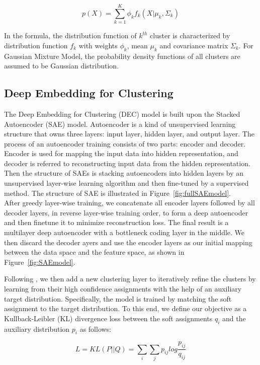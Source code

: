 \documentclass[12pt]{article}
\begin{document}
\begin{equation}
    p(X)=\sum_{k=1}^K\phi_k f_k(X|\mu_k,\Sigma_k)
\end{equation}

In the formula, the distribution function of $k^{th}$ cluster is characterized by distribution function $f_k$ 
with weights $\phi_k$, mean $\mu_k$ and covariance matrix $\Sigma_k$. For Gaussian Mixture Model, the 
probability density functions of all clusters are assumed to be Gaussian distribution.

\subsection{Deep Embedding for Clustering}

The Deep Embedding for Clustering (DEC) model is built upon the Stacked Autoencoder (SAE) model. 
Autoencoder is a kind of unsupervised learning structure that owns three layers: input layer, hidden layer, 
and output layer. The process of an autoencoder training consists of two parts: encoder and decoder. 
Encoder is used for mapping the input data into hidden representation, and decoder is referred to reconstructing 
input data from the hidden representation. Then the structure of SAEs is stacking autoencoders into hidden 
layers by an unsupervised layer-wise learning algorithm and then fine-tuned by a supervised method. The structure
of SAE is illustrated in Figure~\ref{fig:fullSAEmodel}.\\
After greedy layer-wise training, we concatenate all encoder layers followed by all decoder layers, in reverse 
layer-wise training order, to form a deep autoencoder and then finetune it to minimize reconstruction loss. The 
final result is a multilayer deep autoencoder with a bottleneck coding layer in the middle. We then discard the decoder
ayers and use the encoder layers as our initial mapping between the data space and the feature space, as shown in
Figure~\ref{fig:SAEmodel}.\cite{zabalza2016novel}

Following \citep{pmlr-v48-xieb16}, we then add a new clustering layer to iteratively refine the clusters by learning 
from their high confidence assignments with the help of an auxiliary target distribution. Specifically, the model 
is trained by matching the soft assignment to the target distribution. To this end, we define our objective as a 
Kullback-Leibler (KL) divergence loss between the soft assignments $q_i$ and the auxiliary distribution $p_i$ as follows:

\begin{equation}
    L=KL(P||Q)=\sum_i\sum_j p_{ij}log\frac{p_{ij}}{q_{ij}}
\end{equation}
\end{document}
